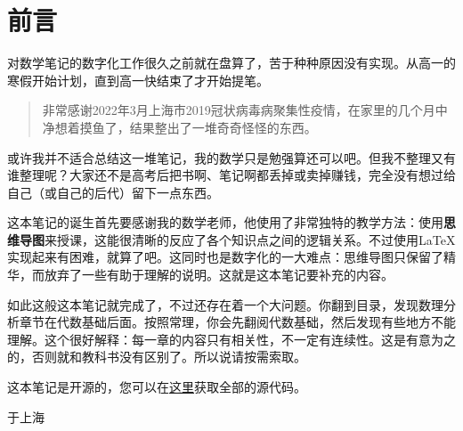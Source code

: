 \section*{前言}
对数学笔记的数字化工作很久之前就在盘算了，苦于种种原因没有实现。从高一的寒假开始计划，直到高一快结束了才开始提笔。

\begin{quote}
	非常感谢2022年3月上海市2019冠状病毒病聚集性疫情，在家里的几个月中净想着摸鱼了，结果整出了一堆奇奇怪怪的东西。
\end{quote}

或许我并不适合总结这一堆笔记，我的数学只是勉强算还可以吧。但我不整理又有谁整理呢？大家还不是高考后把书啊、笔记啊都丢掉或卖掉赚钱，完全没有想过给自己（或自己的后代）留下一点东西。

这本笔记的诞生首先要感谢我的数学老师，他使用了非常独特的教学方法：使用\textbf{思维导图}来授课，这能很清晰的反应了各个知识点之间的逻辑关系。不过使用\LaTeX{}实现起来有困难，就算了吧。这同时也是数字化的一大难点：思维导图只保留了精华，而放弃了一些有助于理解的说明。这就是这本笔记要补充的内容。

如此这般这本笔记就完成了，不过还存在着一个大问题。你翻到目录，发现数理分析章节在代数基础后面。按照常理，你会先翻阅代数基础，然后发现有些地方不能理解。这个很好解释：每一章的内容只有相关性，不一定有连续性。这是有意为之的，否则就和教科书没有区别了。所以说请按需索取。

这本笔记是开源的，您可以在{\color{blue}\href{https://github.com/jason-bowen-zheng/math-notes}{这里}}获取全部的源代码。

\begin{flushright}
	\date{2022年6月}于上海
\end{flushright}
